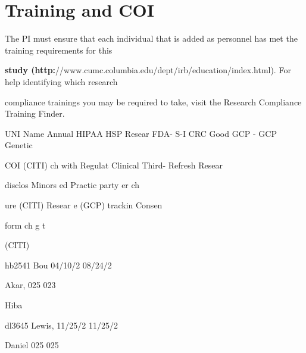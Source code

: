 \documentclass[10pt, letterpaper]{article}
\begin{document}
\section*{Training and COI}

The PI must ensure that each individual that is added as personnel has met the training requirements for this

\noindent \textbf{study (http:}//www.cumc.columbia.edu/dept/irb/education/index.html). For help identifying which research

compliance trainings you may be required to take, visit the Research Compliance Training Finder.

UNI      Name Annual HIPAA HSP             Resear FDA-       S-I     CRC      Good     GCP - GCP        Genetic

\begin{responsebox}

COI              (CITI)   ch with Regulat                    Clinical Third- Refresh Resear

disclos                   Minors ed                          Practic party     er      ch

ure                       (CITI)   Resear                    e (GCP) trackin           Consen

form                               ch                                 g                t

(CITI)

\end{responsebox}

hb2541 Bou       04/10/2          08/24/2

\begin{responsebox}

Akar,   025              023

Hiba

\end{responsebox}

dl3645 Lewis, 11/25/2             11/25/2

\begin{responsebox}

Daniel 025               025

\vspace{0.5em}

\vspace{0.5em}

\vspace{0.5em}

\vspace{0.5em}

\vspace{0.5em}

\end{responsebox}
\end{document}
